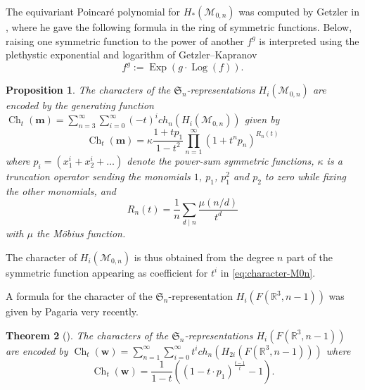 \documentclass[12pt]{article}
\newcommand{\R}{\mathbb{R}}
\newcommand{\SymGroup}[1][n]{\mathfrak{S}_{#1}}
\newcommand{\ModuliCurve}[1]{\mathcal{M}_{#1}}
\theoremstyle{plain}
\newtheorem{thm}{Theorem}[section]
\newtheorem{prop}[thm]{Proposition}
\theoremstyle{definition}
\theoremstyle{remark}
\begin{document}
The equivariant Poincaré polynomial for $H_{\ast}(\ModuliCurve{0,n})$ was computed by Getzler in \cite[Theorem 5.7]{Get95}, where he gave the following formula in the ring of symmetric functions. Below, raising one symmetric function to the power of another $f^g$ is interpreted using the plethystic exponential and logarithm of Getzler--Kapranov \cite{GK-modular-operad}
\[
f^g := \operatorname{Exp}(g \cdot \operatorname{Log}(f)).
\]
\begin{prop}
    The characters of the $\SymGroup$-representations $H_i(\ModuliCurve{0,n})$ are encoded by the generating function %
    $\operatorname{Ch}_t(\mathbf{m}) = \sum_{n=3}^{\infty}\sum_{i=0}^{\infty}{(-t)^i ch_n(H_i(\ModuliCurve{0,n}))}$ given by
    \begin{equation}\label{eq:character-M0n}
        \operatorname{Ch}_t(\mathbf{m}) = \kappa\frac{1+tp_1}{1-t^2}\prod_{n=1}^{\infty}{(1 + t^np_n)^{R_n(t)}}
    \end{equation}
    where $p_i=(x_1^i+x_2^i+\ldots)$ denote the power-sum symmetric functions, $\kappa$ is a truncation operator sending the monomials $1$, $p_1$, $p_{1}^2$ and $p_2$ to zero while fixing the other monomials, and
    \[
        R_n(t) = \frac{1}{n}\sum_{d\mid n}{\frac{\mu(n/d)}{t^d}}
    \]
    with $\mu$ the Möbius function.
\end{prop}
The character of $H_i(\ModuliCurve{0,n})$ is thus obtained from the degree $n$ part of the symmetric function appearing as coefficient for $t^i$ in \eqref{eq:character-M0n}.

A formula for the character of the $\SymGroup$-representation $H_i(F(\R^3,n-1))$ was given by Pagaria very recently.
\begin{thm}[{\cite[Corollary 4.11]{pagaria}}]
The characters of the $\SymGroup$-representations $H_i(F(\R^3,n-1))$ are encoded by 
    $\operatorname{Ch}_t(\mathbf{w}) = \sum_{n=1}^{\infty}\sum_{i=0}^{\infty}{t^i ch_n(H_{2i}(F(\R^3,n-1)))}$ where
    \begin{equation}
    \operatorname{Ch}_t(\mathbf{w}) = \frac{1}{1-t}\left( (1-t\cdot p_1)^{\frac{t-1}{t}} -1\right).
    \end{equation}
\end{thm}
\end{document}
